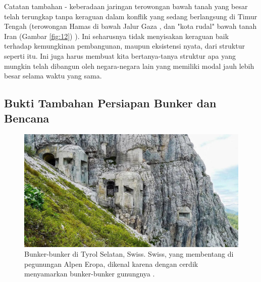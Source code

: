\documentclass[10pt,twocolumn,letterpaper]{article}
\begin{document}
Catatan tambahan - keberadaan jaringan terowongan bawah tanah yang besar telah terungkap tanpa keraguan dalam konflik yang sedang berlangsung di Timur Tengah (terowongan Hamas di bawah Jalur Gaza \cite{38}, dan "kota rudal" bawah tanah Iran (Gambar \ref{fig:12}) \cite{39,40}). Ini seharusnya tidak menyisakan keraguan baik terhadap kemungkinan pembangunan, maupun eksistensi nyata, dari struktur seperti itu. Ini juga harus membuat kita bertanya-tanya struktur apa yang mungkin telah dibangun oleh negara-negara lain yang memiliki modal jauh lebih besar selama waktu yang sama.

\subsection{Bukti Tambahan Persiapan Bunker dan Bencana}

\begin{figure}[t]
\begin{center}
   \includegraphics[width=1\linewidth]{tyrol.jpg}
\end{center}
   \caption{Bunker-bunker di Tyrol Selatan, Swiss. Swiss, yang membentang di pegunungan Alpen Eropa, dikenal karena dengan cerdik menyamarkan bunker-bunker gunungnya \cite{32}.}
\label{fig:7}
\label{fig:onecol}
\end{figure}
\end{document}
